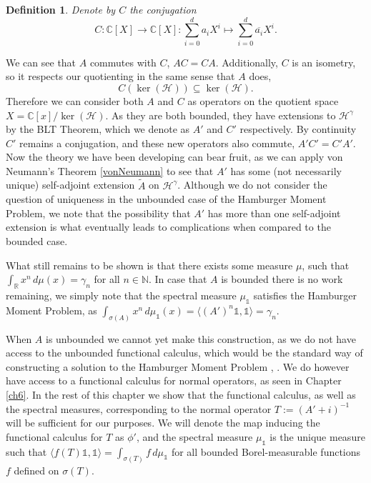 \documentclass[12pt,oneside]{report}
\newtheorem{defn}[thm]{Definition}
\begin{document}
\begin{defn}
    Denote by $C$ the conjugation $$C: \mathbb{C}[X] \to \mathbb{C}[X]: \sum_{i=0}^{d}a_{i}X^{i} \mapsto \sum_{i=0}^{d}\overline{a_{i}}X^{i}.$$
\end{defn}

We can see that $A$ commutes with $C$, $AC = CA$. Additionally, $C$ is an isometry, so it respects our quotienting in the same sense that $A$ does,
$$C(\ker(\mathcal{H})) \subseteq \ker(\mathcal{H}).$$
Therefore we can consider both $A$ and $C$ as operators on the quotient space $X = \mathbb{C}[x]/\ker(\mathcal{H})$. As they are both bounded, they have extensions to $\mathscr{H}^\gamma$ by the BLT Theorem, which we denote as $A'$ and $C'$ respectively. By continuity $C'$ remains a conjugation, and these new operators also commute, $A'C' = C'A'$. Now the theory we have been developing can bear fruit, as we can apply von Neumann's Theorem \ref{vonNeumann} to see that $A'$ has some (not necessarily unique) self-adjoint extension $\tilde{A}$ on $\mathscr{H}^\gamma$. Although we do not consider the question of uniqueness in the unbounded case of the Hamburger Moment Problem, we note that the possibility that $A'$ has more than one self-adjoint extension is what eventually leads to complications when compared to the bounded case. \cite{simon_classical_1998}

What still remains to be shown is that there exists some measure $\mu$, such that $\int _{\mathbb{R}} x^{n} \, d\mu(x) = \gamma_{n}$ for all $n \in \mathbb{N}$. In case that $A$ is bounded there is no work remaining, we simply note that the spectral measure $\mu_{\mathds{1}}$ satisfies the Hamburger Moment Problem, as $\int _{\sigma(A)} x^{n} \, d\mu_{\mathds{1}}(x) = \langle (A')^{n}\mathds{1},\mathds{1} \rangle = \gamma_{n}$.

When $A$ is unbounded we cannot yet make this construction, as we do not have access to the unbounded functional calculus, which would be the standard way of constructing a solution to the Hamburger Moment Problem \cite{Reed_Simon_1975}, \cite{simon_classical_1998}. We do however have access to a functional calculus for normal operators, as seen in Chapter \ref{ch6}. In the rest of this chapter we show that the functional calculus, as well as the spectral measures, corresponding to the normal operator $T := (A'+i)^{-1}$ will be sufficient for our purposes. We will denote the map inducing the functional calculus for $T$ as $\phi'$, and the spectral measure $\mu_{\mathds{1}}$ is the unique measure such that $\langle f(T)\mathds{1},\mathds{1} \rangle = \int _{\sigma(T)} f \, d\mu_{\mathds{1}}$ for all bounded Borel-measurable functions $f$ defined on $\sigma(T)$.
\end{document}
